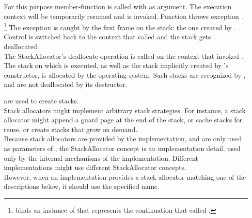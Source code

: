 For this purpose member-function \resumewith is called with \unwindcont as
argument. The execution context will be temporarily resumed and \unwindcont is
invoked. Function \unwindcont throws exception \unwindex.
\footnote{\unwindex binds an instance of \cont that represents the continuation
that called \resumewith.}
The exception is caught by the first frame on the stack: the one created by
\callcc. Control is switched back to the context that called \dtor and the
stack gets deallocated.\\

The StackAllocator's deallocate operation is called on the context that invoked
\dtor.\\

The stack on which  is executed, as well as the stack implicitly
created by 's constructor, is allocated by the operating
system. Such stacks are recognized by \cont, and are not deallocated by its
destructor.


\label{subsec:stackalloc}

are used to create stacks.\\

Stack allocators might implement arbitrary stack strategies. For instance, a
stack allocator might append a guard page at the end of the stack, or cache
stacks for reuse, or create stacks that grow on demand.\\

Because stack allocators are provided by the implementation, and are only used
as parameters of \callcc, the StackAllocator concept is an implementation detail,
used only by the internal mechanisms of the \cc implementation. Different
implementations might use different StackAllocator concepts.\\

However, when an implementation provides a stack allocator matching one of
the descriptions below, it should use the specified name.\\

